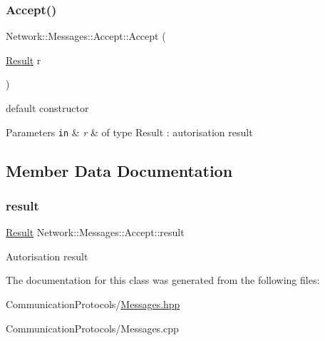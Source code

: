 \subsubsection{\texorpdfstring{Accept()}{Accept()}}
{\footnotesize\ttfamily Network\+::\+Messages\+::\+Accept\+::\+Accept (\begin{DoxyParamCaption}\item[{\hyperlink{class_network_1_1_messages_1_1_base_a646d774928c7dfac987228f26ab5d46a}{Result}}]{r }\end{DoxyParamCaption})\hspace{0.3cm}{\ttfamily [inline]}}



default constructor 


\begin{DoxyParams}[1]{Parameters}
\mbox{\tt in}  & {\em r} & of type Result \+: autorisation result \\
\hline
\end{DoxyParams}


\subsection{Member Data Documentation}
\mbox{\label{class_network_1_1_messages_1_1_accept_ac177c23980f913c99190ffe445f7963b}} 
\subsubsection{\texorpdfstring{result}{result}}
{\footnotesize\ttfamily \hyperlink{class_network_1_1_messages_1_1_base_a646d774928c7dfac987228f26ab5d46a}{Result} Network\+::\+Messages\+::\+Accept\+::result}

Autorisation result 

The documentation for this class was generated from the following files\+:\begin{DoxyCompactItemize}
\item 
Communication\+Protocols/\hyperlink{_messages_8hpp}{Messages.\+hpp}\item 
Communication\+Protocols/Messages.\+cpp\end{DoxyCompactItemize}
